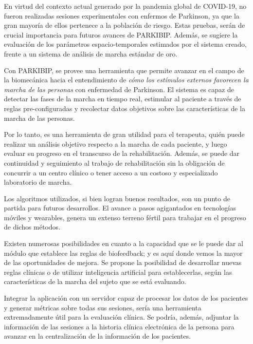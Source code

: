 En virtud del contexto actual generado por la pandemia global de COVID-19, no fueron realizadas sesiones experimentales con enfermos de Parkinson, ya que la gran mayoría de ellos pertenece a la población de riesgo. Estas pruebas, serán de crucial importancia para futuros avances de PARKIBIP. Además, se sugiere la evaluación de los parámetros espacio-temporales estimados por el sistema creado, frente a un sistema de análisis de marcha estándar de oro. 


Con PARKIBIP, se provee una herramienta que permite avanzar en el campo de la biomecánica hacia el entendimiento de \textit{cómo los estímulos externos favorecen la marcha de las personas} con enfermedad de Parkinson. El sistema es capaz de detectar las fases de la marcha en tiempo real, estimular al paciente a través de reglas pre-configuradas y recolectar datos objetivos sobre las características de la marcha de las personas. 

Por lo tanto, es una herramienta de gran utilidad para el terapeuta, quién puede realizar un análisis objetivo respecto a la marcha de cada paciente, y luego evaluar su progreso en el transcurso de la rehabilitación. Además, se puede dar continuidad y seguimiento al trabajo de rehabilitación sin la obligación de concurrir a un centro clínico o tener acceso a un costoso y especializado laboratorio de marcha. 


Los algoritmos utilizados, si bien logran buenos resultados, son un punto de partida para futuros desarrollos. El avance a pasos agigantados en tecnologías móviles y wearables, genera un extenso terreno fértil para trabajar en el progreso de dichos métodos.

Existen numerosas posibilidades en cuanto a la capacidad que se le puede dar al módulo que establece las reglas de \gls{biofeedback}; y es aquí donde vemos la mayor de las oportunidades de mejora. Se propone la posibilidad de desarrollar nuevas reglas clínicas o de utilizar inteligencia artificial para establecerlas, según las características de la marcha del sujeto que se está evaluando. 

Integrar la aplicación con un servidor capaz de procesar los datos de los pacientes y generar métricas sobre todas sus sesiones, sería una herramienta extremadamente útil para la evaluación clínica. Se podría, además, adjuntar la información de las sesiones a la historia clínica electrónica de la persona para avanzar en la centralización de la información de los pacientes. 

